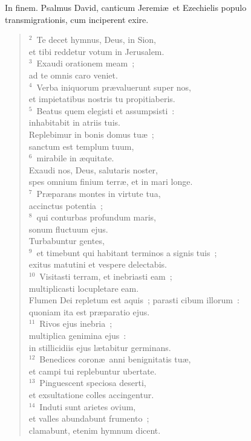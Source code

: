 \lettrine[lines=3,image=true,loversize=0.05,lraise=-0.03]{I}{}n finem. Psalmus David, canticum Jeremi\ae\ et Ezechielis populo transmigrationis, cum inciperent exire.
\begin{flushleft}\begin{verse}\vspace{6pt}${}^{2}$~Te decet hymnus, Deus, in Sion,\\ et tibi reddetur votum in Jerusalem.\\
${}^{3}$~Exaudi orationem meam~;\\ ad te omnis caro veniet.\\
${}^{4}$~Verba iniquorum pr\ae valuerunt super nos,\\ et impietatibus nostris tu propitiaberis.\\
${}^{5}$~Beatus quem elegisti et assumpsisti~:\\ inhabitabit in atriis tuis.\\ Replebimur in bonis domus tu\ae~;\\ sanctum est templum tuum,\\
${}^{6}$~mirabile in \ae quitate.\\ Exaudi nos, Deus, salutaris noster,\\ spes omnium finium terr\ae , et in mari longe.\\
${}^{7}$~Pr\ae parans montes in virtute tua,\\ accinctus potentia~;\\
${}^{8}$~qui conturbas profundum maris,\\ sonum fluctuum ejus.\\ Turbabuntur gentes,\\
${}^{9}$~et timebunt qui habitant terminos a signis tuis~;\\ exitus matutini et vespere delectabis.\\
${}^{10}$~Visitasti terram, et inebriasti eam~;\\ multiplicasti locupletare eam.\\ Flumen Dei repletum est aquis~; parasti cibum illorum~:\\ quoniam ita est pr\ae paratio ejus.\\
${}^{11}$~Rivos ejus inebria~;\\ multiplica genimina ejus~:\\ in stillicidiis ejus l\ae tabitur germinans.\\
${}^{12}$~Benedices coron\ae\ anni benignitatis tu\ae ,\\ et campi tui replebuntur ubertate.\\
${}^{13}$~Pinguescent speciosa deserti,\\ et exsultatione colles accingentur.\\
${}^{14}$~Induti sunt arietes ovium,\\ et valles abundabunt frumento~;\\ clamabunt, etenim hymnum dicent.\end{verse}\end{flushleft}



